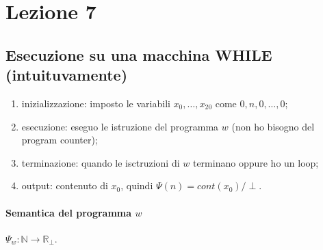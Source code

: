 \documentclass{article}
\begin{document}
\section{Lezione 7}
\subsection{Esecuzione su una macchina WHILE (intuituvamente)}
\begin{enumerate}
	\item inizializzazione: imposto le variabili $x_0, \dots, x_{20}$ come $0,n,0,\dots, 0$;
	\item esecuzione: eseguo le istruzione del programma $w$ (non ho bisogno del program counter);
	\item terminazione: quando le isctruzioni di $w$ terminano oppure ho un loop;
	\item output: contenuto di $x_0$, quindi $\Psi(n)=\textit{cont}(x_0)/\perp$.
\end{enumerate}
\paragraph{Semantica del programma $w$}
$\Psi_w: \mathbb{N} \rightarrow \mathbb{R}_{\perp}$.
\end{document}
